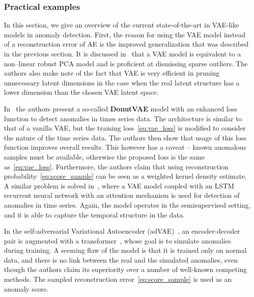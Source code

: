 \subsubsection{Practical examples}
In this section, we give an overview of the current state-of-the-art in VAE-like models in anomaly detection. First, the reason for using the VAE model instead of a reconstruction error of AE is the improved generalization that was described in the previous section. It is discussed in~\cite{dai2017hidden} that a VAE model is equivalent to a non--linear robust PCA model and is proficient at dismissing sparse outliers. The authors also make note of the fact that VAE is very efficient in pruning unnecessary latent dimensions in the case when the real latent structure has a lower dimension than the chosen VAE latent space.

In~\cite{xu2018unsupervised} the authors present a so-called \textbf{DonutVAE} model with an enhanced loss function to detect anomalies in times series data. The architecture is similar to that of a vanilla VAE, but the training loss~\eqref{eq:vae_loss} is modified to consider the nature of the time series data. The authors then show that usage of this loss function improves overall results. This however has a caveat -- known anomalous samples must be available, otherwise the proposed loss is the same as~\eqref{eq:vae_loss}. Furthermore, the authors claim that using reconstruction probability~\eqref{eq:score_sample} can be seen as a weighted kernel density estimate. A similar problem is solved in~\cite{pereira2018unsupervised}, where a VAE model coupled with an LSTM recurrent neural network with an attention mechanism is used for detection of anomalies in time series. Again, the model operates in the semisupervised setting, and it is able to capture the temporal structure in the data. 

In the self-adversarial Variational Autoencoder (adVAE)~\cite{wang2020advae}, an encoder-decoder pair is augmented with a transformer~\cite{vaswani2017attention}, whose goal is to simulate anomalies during training. A seeming flaw of the model is that it is trained only on normal data, and there is no link between the real and the simulated anomalies, even though the authors claim its superiority over a number of well-known competing methods. The sampled reconstruction error~\ref{eq:score_sample} is used as an anomaly score.

